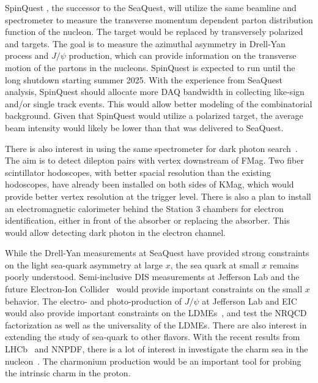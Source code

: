 \documentclass[../main.tex]{subfiles}
\begin{document}
SpinQuest \cite{geesaman2014}, the successor to the SeaQuest, will utilize the same beamline and
spectrometer to measure the transverse momentum dependent parton distribution
function of the nucleon. The target would be replaced by transversely polarized 
and  targets. The goal is to measure the azimuthal asymmetry in
Drell-Yan process and $J/\psi$ production, which can provide information on the
transverse motion of the partons in the nucleons.
SpinQuest is expected to run until the long shutdown starting summer 2025. With the experience
from SeaQuest analysis, SpinQuest should allocate more DAQ bandwidth in collecting
like-sign and/or single track events. This would allow better modeling of the combinatorial
background. Given that SpinQuest would utilize a polarized target,
the average beam intensity would likely be lower than that was delivered to SeaQuest.

There is also interest in using the same spectrometer for dark photon search~\cite{apyan2022}.
The aim is to detect dilepton pairs with vertex downstream of FMag.
Two fiber scintillator hodoscopes, with better spacial resolution than the existing hodoscopes,
have already been installed on both sides of KMag,
which would provide better vertex resolution at the trigger level.
There is also a plan to install an electromagnetic calorimeter behind the
Station 3 chambers for electron identification, either in front of the absorber or replacing the absorber.
This would allow detecting dark photon in the electron channel.

While the Drell-Yan measurements at SeaQuest have provided strong constraints on the light sea-quark
asymmetry at large $x$, the sea quark at small $x$ remains poorly understood.
Semi-inclusive DIS measurements at Jefferson Lab and the future Electron-Ion Collider~\cite{abdulkhalek2022}
would provide important constraints on the small $x$ behavior. 
The electro- and photo-production of $J/\psi$ at Jefferson Lab and EIC would also provide important
constraints on the LDMEs~\cite{qiu2021}, and test the NRQCD factorization as well as the universality of the LDMEs. 
There are also interest in extending the study of sea-quark to other flavors. 
With the recent results from LHCb~\cite{aaij2022} and NNPDF\cite{ball2022},
there is a lot of interest in investigate the charm sea in the nucleon~\cite{vogt2021,vogt2023}.
The charmonium production would be an important tool for probing the intrinsic charm in the proton.

\ifSubfilesClassLoaded{ \printbibliography[heading=bibintoc,title={References}]}{}
\end{document}
